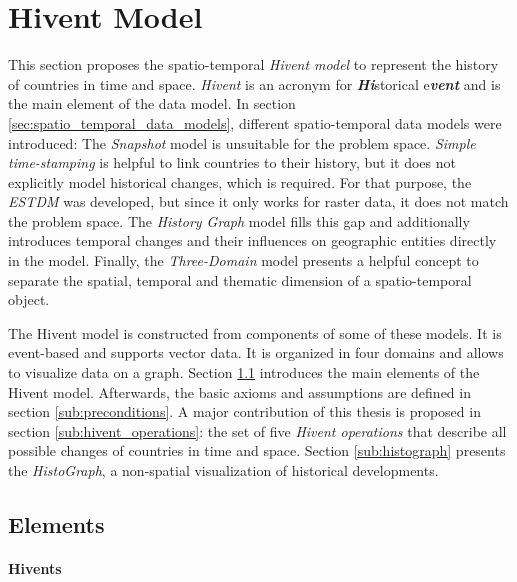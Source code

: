 
\section{Hivent Model} %
\label{sec:hivent_model}

This section proposes the spatio-temporal \emph{Hivent model} to represent the history of countries in time and space. \emph{Hivent} is an acronym for \emph{\textbf{Hi}}storical e\emph{\textbf{vent}} and is the main element of the data model. In section \ref{sec:spatio_temporal_data_models}, different spatio-temporal data models were introduced: The \emph{Snapshot} model is unsuitable for the problem space. \emph{Simple time-stamping} is helpful to link countries to their history, but it does not explicitly model historical changes, which is required. For that purpose, the \emph{ESTDM} was developed, but since it only works for raster data, it does not match the problem space. The \emph{History Graph} model fills this gap and additionally introduces temporal changes and their influences on geographic entities directly in the model. Finally, the \emph{Three-Domain} model presents a helpful concept to separate the spatial, temporal and thematic dimension of a spatio-temporal object.

The Hivent model is constructed from components of some of these models. It is event-based and supports vector data. It is organized in four domains and allows to visualize data on a graph.
Section \ref{sub:elements} introduces the main elements of the Hivent model. Afterwards, the basic axioms and assumptions are defined in section \ref{sub:preconditions}. A major contribution of this thesis is proposed in section \ref{sub:hivent_operations}: the set of five \emph{Hivent operations} that describe all possible changes of countries in time and space.
Section \ref{sub:histograph} presents the \emph{HistoGraph}, a non-spatial visualization of historical developments.

\subsection{Elements} %
\label{sub:elements}

\paragraph{Hivents} %
\label{par:hivent}

